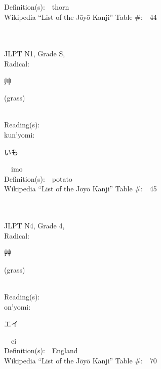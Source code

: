 \begin{multicols}{2}
Definition(s):\ \ thorn \\
Wikipedia ``List of the J\=oy\=o Kanji'' Table \#:\ \ 44 \\
\ \ \\
{\fontsize{34pt}{40pt}  }\ \ \\
{JLPT N1, Grade S, \\Radical:\ \ {\begin{CJK}{UTF8}{min} 艸 \end{CJK}} (grass) } \\
Reading(s):\ \ \\
{\hspace*{1em}}kun'yomi:\ \ \\
{\hspace*{2em}}{\begin{CJK}{UTF8}{min} いも \end{CJK}}\ \ imo\ \ \\
Definition(s):\ \ potato \\
Wikipedia ``List of the J\=oy\=o Kanji'' Table \#:\ \ 45 \\
\ \ \\
{\fontsize{34pt}{40pt}  }\ \ \\  %
{JLPT N4, Grade 4, \\Radical:\ \ {\begin{CJK}{UTF8}{min} 艸 \end{CJK}} (grass) } \\
Reading(s):\ \ \\
{\hspace*{1em}}on'yomi:\ \ \\
{\hspace*{2em}}{\begin{CJK}{UTF8}{min} エイ \end{CJK}}\ \ ei\ \ \\
Definition(s):\ \ England \\
Wikipedia ``List of the J\=oy\=o Kanji'' Table \#:\ \ 70 \\
\ \ \\
{\fontsize{34pt}{40pt}  }\ \ \\  %

\end{multicols}
